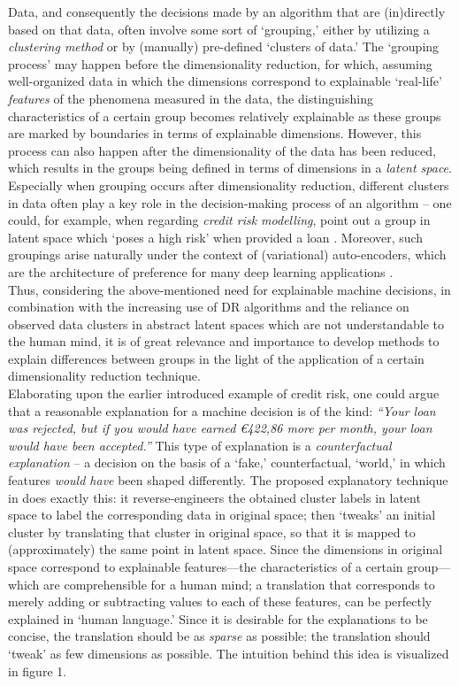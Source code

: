 Data, and consequently the decisions made by an algorithm that are (in)directly based on that data, often involve some sort of `grouping,' either by utilizing a \textit{clustering method} or by (manually) pre-defined `clusters of data.' The `grouping process' may happen before the dimensionality reduction, for which, assuming well-organized data in which the dimensions correspond to explainable `real-life' \textit{features} of the phenomena measured in the data, the distinguishing characteristics of a certain group becomes relatively explainable as these groups are marked by boundaries in terms of explainable dimensions. However, this process can also happen after the dimensionality of the data has been reduced, which results in the groups being defined in terms of dimensions in a \textit{latent space}. Especially when grouping occurs after dimensionality reduction, different clusters in data often play a key role in the decision-making process of an algorithm -- one could, for example, when regarding \textit{credit risk modelling}, point out a group in latent space which `poses a high risk' when provided a loan \cite{MANCISIDOR2021114020}. Moreover, such groupings arise naturally under the context of (variational) auto-encoders, which are the architecture of preference for many deep learning applications \cite[p.~8]{plumb2020explaining}.\\

Thus, considering the above-mentioned need for explainable machine decisions, in combination with the increasing use of DR algorithms and the reliance on observed data clusters in abstract latent spaces which are not understandable to the human mind, it is of great relevance and importance to develop methods to explain differences between groups in the light of the application of a certain dimensionality reduction technique.\\

Elaborating upon the earlier introduced example of credit risk, one could argue that a reasonable explanation for a machine decision is of the kind: \textit{``Your loan was rejected, but if you would have earned \euro422,86 more per month, your loan would have been accepted.''} This type of explanation is a \textit{counterfactual explanation} -- a decision on the basis of a `fake,' counterfactual, `world,' in which features \textit{would have} been shaped differently. The proposed explanatory technique in \cite{plumb2020explaining} does exactly this: it reverse-engineers the obtained cluster labels in latent space to label the corresponding data in original space; then `tweaks' an initial cluster by translating that cluster in original space, so that it is mapped to (approximately) the same point in latent space. Since the dimensions in original space correspond to explainable features---the characteristics of a certain group---which are comprehensible for a human mind; a translation that corresponds to merely adding or subtracting values to each of these features, can be perfectly explained in `human language.' Since it is desirable for the explanations to be concise, the translation should be as \textit{sparse} as possible: the translation should `tweak' as few dimensions as possible. The intuition behind this idea is visualized in figure 1.

